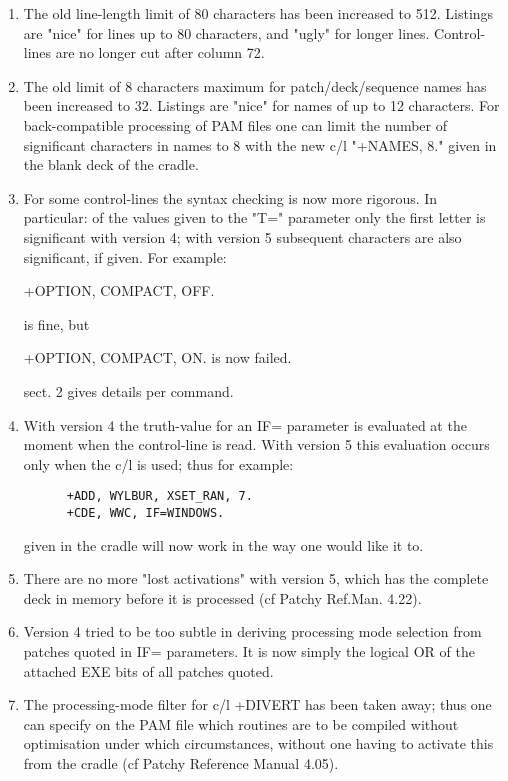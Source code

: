 \begin{enumerate}
\item
The old line-length limit of 80 characters has been increased to 512.
Listings are "nice" for lines up to 80 characters, and "ugly" for longer
lines. Control-lines are no longer cut after column 72.

\item
The old limit of 8 characters maximum for patch/deck/sequence names has
been increased to 32. Listings are "nice" for names of up to 12 characters.
For back-compatible processing of PAM files one can limit the number of
significant characters in names to 8 with the new c/l "+NAMES, 8." given
in the blank deck of the cradle.

\item
For some control-lines the syntax checking is now more rigorous.
In particular: of the values given to the "T=" parameter only the first
letter is significant with version 4; with version 5 subsequent characters
are also significant, if given. For example:

      +OPTION, COMPACT, OFF.

is fine, but

      +OPTION, COMPACT, ON.     is now failed.

sect. 2 gives details per command.

\item
With version 4 the truth-value for an IF= parameter is evaluated at
the moment when the control-line is read. With version 5 this evaluation
occurs only when the c/l is used; thus for example:
\begin{verbatim}
      +ADD, WYLBUR, XSET_RAN, 7.
      +CDE, WWC, IF=WINDOWS.
\end{verbatim}

given in the cradle will now work in the way one would like it to.

\item
There are no more "lost activations" with version 5, which has the
complete deck in memory before it is processed (cf Patchy Ref.Man. 4.22).

\item
Version 4 tried to be too subtle in deriving processing mode
selection from patches quoted in IF= parameters. It is now simply
the logical OR of the attached EXE bits of all patches quoted.

\item
The processing-mode filter for c/l +DIVERT has been taken away;
thus one can specify on the PAM file which routines are to be compiled
without optimisation under which circumstances, without one having
to activate this from the cradle (cf Patchy Reference Manual 4.05).


\end{enumerate}
